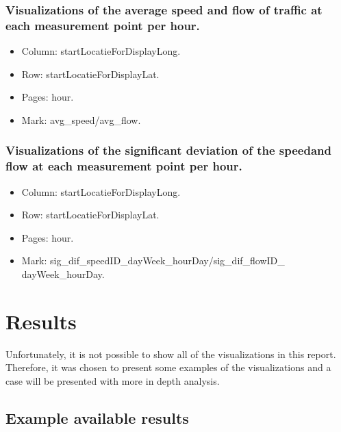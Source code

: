 \documentclass[sigconf]{acmart}
\begin{document}
\subsubsection{Visualizations of the average speed and flow of traffic at each measurement point per hour.}\hspace*{\fill}
\begin{itemize}
    \item Column: startLocatieForDisplayLong.
    \item Row: startLocatieForDisplayLat.
    \item Pages: hour.
    \item Mark: avg\_speed/avg\_flow.
\end{itemize}

\subsubsection{Visualizations of the significant deviation of the speedand flow at each measurement point per hour.}\hspace*{\fill}
\begin{itemize}
    \item Column: startLocatieForDisplayLong.
    \item Row: startLocatieForDisplayLat.
    \item Pages: hour.
    \item Mark: sig\_dif\_speedID\_dayWeek\_hourDay/sig\_dif\_flowID\_ dayWeek\_hourDay.
\end{itemize}


\section{Results}

Unfortunately, it is not possible to show all of the visualizations in this report. Therefore, it was chosen to present some examples of the visualizations and a case will be presented with more in depth analysis. 

\subsection{Example available results}
\end{document}
